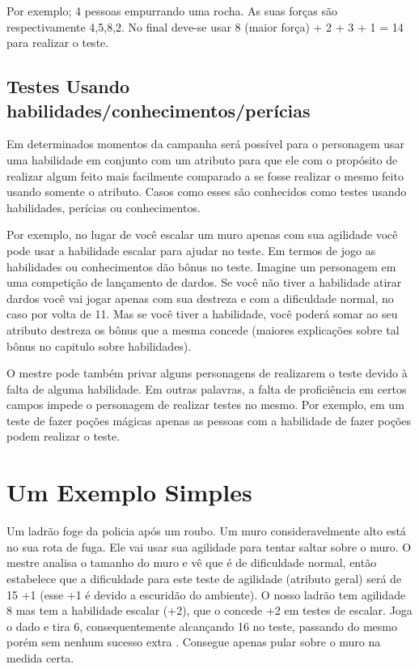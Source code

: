 Por exemplo; 4 pessoas empurrando uma rocha. As suas forças são respectivamente 4,5,8,2. No final deve-se usar 8 (maior força) + 2 + 3 + 1 = 14 para realizar o teste.

\subsection{Testes Usando habilidades/conhecimentos/perícias}

Em determinados momentos da campanha será possível para o personagem usar uma habilidade em conjunto com um atributo para que ele com o propósito de realizar algum feito mais facilmente comparado a se fosse realizar o mesmo feito usando somente o atributo. Casos como esses são conhecidos como testes usando habilidades, perícias ou conhecimentos.

Por exemplo, no lugar de você escalar um muro apenas com sua agilidade você pode usar a habilidade escalar para ajudar no teste. Em termos de jogo as habilidades ou conhecimentos dão bônus no teste. Imagine um personagem em uma competição de lançamento de dardos. Se você não tiver a habilidade atirar dardos você vai jogar apenas com sua destreza e com a dificuldade normal, no caso por volta de 11. Mas se você tiver a habilidade, você poderá somar ao seu atributo destreza os bônus que a mesma concede (maiores explicações sobre tal bônus no capitulo sobre habilidades).

O mestre pode também privar alguns personagens de realizarem o teste devido à falta de alguma habilidade. Em outras palavras, a falta de proficiência em certos campos impede o personagem de realizar testes no mesmo. Por exemplo, em um teste de fazer poções mágicas apenas as pessoas com a habilidade de fazer poções podem realizar o teste.

\section{Um Exemplo Simples}

Um ladrão foge da policia após um roubo. Um muro consideravelmente alto está no sua rota de fuga. Ele vai usar sua agilidade para tentar saltar sobre o muro. O mestre analisa o tamanho do muro e vê que é de dificuldade normal, então estabelece que a dificuldade para este teste de agilidade (atributo geral) será de 15 +1 (esse +1 é devido a escuridão do ambiente). O nosso ladrão tem agilidade 8 mas tem a habilidade escalar (+2), que o concede +2 em testes de escalar. Joga o dado e tira 6, consequentemente alcançando 16 no teste, passando do mesmo porém sem nenhum sucesso extra . Consegue apenas pular sobre o muro na medida certa. 

